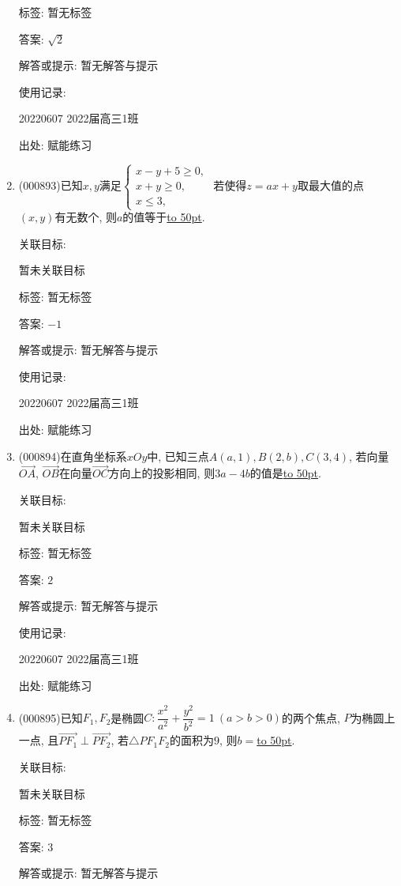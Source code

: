 \documentclass[10pt,a4paper]{article}
\newcommand{\blank}[1]{\underline{\hbox to #1pt{}}}
\begin{document}
\begin{enumerate}[1.]
标签: 暂无标签

答案: $\sqrt 2$

解答或提示: 暂无解答与提示

使用记录:

20220607	2022届高三1班	


出处: 赋能练习
\item { (000893)}已知$x,y$满足$\begin{cases}
   x-y+5 \ge 0, \\ x+y\ge 0, \\ x\le 3, \end{cases}$ 若使得$z=ax+y$取最大值的点$(x,y)$有无数个, 则$a$的值等于\blank{50}.


关联目标:

暂未关联目标



标签: 暂无标签

答案: $-1$

解答或提示: 暂无解答与提示

使用记录:

20220607	2022届高三1班	


出处: 赋能练习
\item { (000894)}在直角坐标系$xOy$中, 已知三点$A(a,1),B(2,b),C(3,4)$, 若向量$\overrightarrow{OA}$, $\overrightarrow{OB}$在向量$\overrightarrow{OC}$方向上的投影相同, 则$3a-4b$的值是\blank{50}.


关联目标:

暂未关联目标



标签: 暂无标签

答案: $2$

解答或提示: 暂无解答与提示

使用记录:

20220607	2022届高三1班	


出处: 赋能练习
\item { (000895)}已知$F_1,F_2$是椭圆$C:\dfrac{x^2}{a^2}+\dfrac{y^2}{b^2}=1\ (a>b>0)$的两个焦点, $P$为椭圆上一点, 且$\overrightarrow{PF_1}\perp \overrightarrow{PF_2}$, 若$\triangle PF_1F_2$的面积为$9$, 则$b=$\blank{50}.


关联目标:

暂未关联目标



标签: 暂无标签

答案: $3$

解答或提示: 暂无解答与提示


\end{enumerate}
\end{document}
